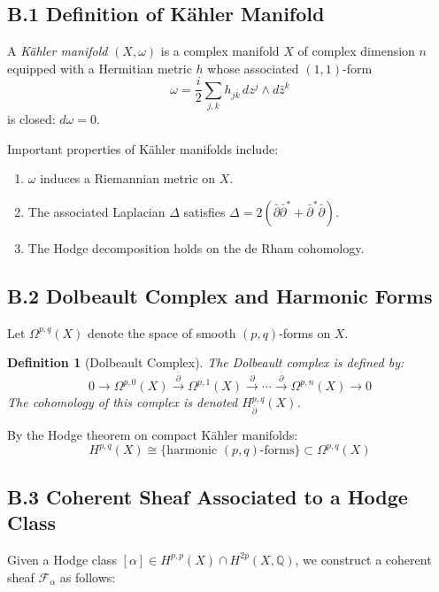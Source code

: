 \documentclass[11pt]{article}
\newtheorem{definition}[theorem]{Definition}
\begin{document}

\subsection*{B.1 Definition of Kähler Manifold}

A \emph{Kähler manifold} $(X, \omega)$ is a complex manifold $X$ of complex dimension $n$ equipped with a Hermitian metric $h$ whose associated $(1,1)$-form
\[
\omega = \frac{i}{2} \sum_{j,k} h_{j\bar{k}} \, dz^j \wedge d\bar{z}^k
\]
is closed: $d\omega = 0$.

Important properties of Kähler manifolds include:

\begin{enumerate}
  \item $\omega$ induces a Riemannian metric on $X$.
  \item The associated Laplacian $\Delta$ satisfies $\Delta = 2(\bar{\partial}\bar{\partial}^* + \bar{\partial}^*\bar{\partial})$.
  \item The Hodge decomposition holds on the de Rham cohomology.
\end{enumerate}

\subsection*{B.2 Dolbeault Complex and Harmonic Forms}

Let $\Omega^{p,q}(X)$ denote the space of smooth $(p,q)$-forms on $X$.

\begin{definition}[Dolbeault Complex]
The Dolbeault complex is defined by:
\[
0 \to \Omega^{p,0}(X) \xrightarrow{\bar{\partial}} \Omega^{p,1}(X) \xrightarrow{\bar{\partial}} \cdots \xrightarrow{\bar{\partial}} \Omega^{p,n}(X) \to 0
\]
The cohomology of this complex is denoted $H^{p,q}_{\bar{\partial}}(X)$.
\end{definition}

By the Hodge theorem on compact Kähler manifolds:
\[
H^{p,q}(X) \cong \{ \text{harmonic } (p,q)\text{-forms} \} \subset \Omega^{p,q}(X)
\]

\subsection*{B.3 Coherent Sheaf Associated to a Hodge Class}

Given a Hodge class $[\alpha] \in H^{p,p}(X) \cap H^{2p}(X, \mathbb{Q})$, we construct a coherent sheaf $\mathcal{F}_\alpha$ as follows:
\end{document}
